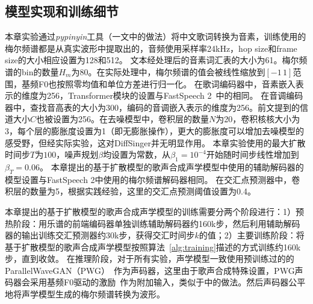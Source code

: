 \subsection{模型实现和训练细节}
\label{sec:svs_inference}
本章实验通过\textit{pypinyin}工具（\citet{ren2020deepsinger}一文中的做法）将中文歌词转换为音素，训练使用的梅尔频谱都是从真实波形中提取出的，音频使用采样率24kHz，hop size和frame size的大小相应设置为128和512。
文本经处理后的音素词汇表的大小为61。梅尔频谱的bin的数量$H_m$为80。在实际处理中，梅尔频谱的值会被线性缩放到$[-1\,1]$范围，基频F0也按照零均值和单位方差进行归一化。
在歌词编码器中，音素嵌入表示的维度为256，Transformer模块的设置与FastSpeech 2~\citep{ren2021fastspeech}中的相同。
在音调编码器中，查找音高表的大小为300，编码的音调嵌入表示的维度为256。前文提到的信道大小$C$也被设置为256。在去噪模型中，卷积层的数量$N$为20，卷积核核大小为3，每个层的膨胀度设置为1（即无膨胀操作），更大的膨胀度可以增加去噪模型的感受野，但经实际实验，这对DiffSinger并无明显作用。
本章实验使用的最大扩散时间步$T$为$100$，噪声规划$\beta$均设置为常数，从$\beta_1=10^{-4}$开始随时间步线性增加到$\beta_T=0.06$。
本章提出的基于扩散模型的歌声合成声学模型中使用的辅助解码器的模型设置与FastSpeech 2中使用的梅尔频谱解码器相同。
在交汇点预测器中，卷积层的数量为5，根据实践经验，这里的交汇点预测阈值设置为0.4。


本章提出的基于扩散模型的歌声合成声学模型的训练需要分两个阶段进行：1）预热阶段：用乐谱的前端编码器单独训练辅助解码器约160k步，然后利用辅助解码器的输出训练交汇预测器约30k步，获得交汇时间步$k$的值；2）主要训练阶段：将基于扩散模型的歌声合成声学模型按照算法~\ref{alg:training}描述的方式训练约160k步，直到收敛。
在推理阶段，对于所有实验，声学模型一致使用预训练过的的ParallelWaveGAN（PWG）~\citep{yamamoto2020parallel}作为声码器，这里由于歌声合成特殊设置，PWG声码器会采用基频F0驱动的激励~\citep{wang2020using}作为附加输入，类似于\citet{chen2020hifisinger}中的做法。然后声码器公平地将声学模型生成的梅尔频谱转换为波形。
